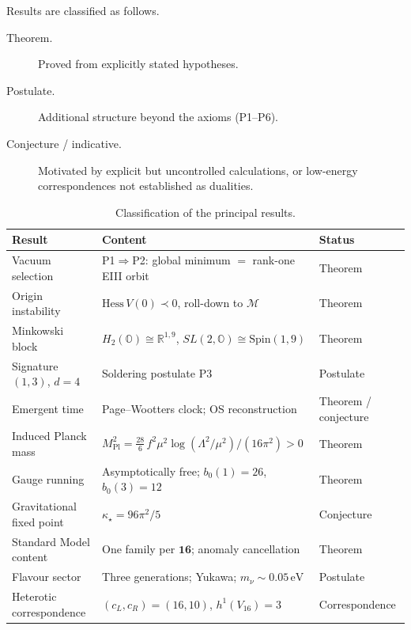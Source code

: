 \documentclass[11pt]{article}
\theoremstyle{plain}
\theoremstyle{definition}
\theoremstyle{remark}
\begin{document}
Results are classified as follows.
\begin{description}
  \item[Theorem.] Proved from explicitly stated hypotheses.
  \item[Postulate.] Additional structure beyond the axioms (P1--P6).
  \item[Conjecture / indicative.] Motivated by explicit but uncontrolled
    calculations, or low-energy correspondences not established as dualities.
\end{description}

\begin{table}[t]
  \centering
  \begin{tabular}{@{}lll@{}}
    \toprule
    Result & Content & Status \\
    \midrule
    Vacuum selection
      & P1$\Rightarrow$P2: global minimum $=$ rank-one EIII orbit
      & Theorem \\
    Origin instability
      & $\mathrm{Hess}\,V(0)\prec 0$, roll-down to $\mathcal{M}$
      & Theorem \\
    Minkowski block
      & $H_2(\mathbb{O})\cong\mathbb{R}^{1,9}$, $SL(2,\mathbb{O})\cong\mathrm{Spin}(1,9)$
      & Theorem \\
    Signature $(1,3)$, $d=4$
      & Soldering postulate P3
      & Postulate \\
    Emergent time
      & Page--Wootters clock; OS reconstruction
      & Theorem / conjecture \\
    Induced Planck mass
      & $M_{\mathrm{Pl}}^{2}=\tfrac{28}{6}\,f^{2}\mu^{2}\log(\Lambda^{2}/\mu^{2})/(16\pi^{2})>0$
      & Theorem \\
    Gauge running
      & Asymptotically free; $b_0(1)=26$, $b_0(3)=12$
      & Theorem \\
    Gravitational fixed point
      & $\kappa_\star=96\pi^{2}/5$
      & Conjecture \\
    Standard Model content
      & One family per $\mathbf{16}$; anomaly cancellation
      & Theorem \\
    Flavour sector
      & Three generations; Yukawa; $m_\nu\sim 0.05\,\mathrm{eV}$
      & Postulate \\
    Heterotic correspondence
      & $(c_L,c_R)=(16,10)$, $h^{1}(V_{16})=3$
      & Correspondence \\
    \bottomrule
  \end{tabular}
  \caption{Classification of the principal results.}
  \label{tab:intro:grades}
\end{table}
\end{document}
